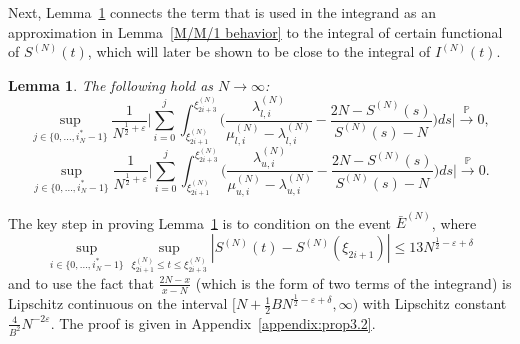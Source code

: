 \documentclass[11pt, reqno]{article}
\newtheorem{lemma}[theorem]{Lemma}
\numberwithin{equation}{section}
\numberwithin{theorem}{section}
\newcommand{\pto}{\ensuremath{\xrightarrow{\ \mathbb{P}\ }}}  %
\begin{document}
Next, Lemma~\ref{approx. rate} connects the term that is used in the integrand as an approximation in Lemma~\ref{M/M/1 behavior} to the integral of certain functional of $S^{(N)}(t)$, which will later be shown to be close to the integral of $I^{(N)}(t)$.
\begin{lemma}\label{approx. rate}
The following hold as $N\to\infty$:
\begin{equation}\label{eq:A7-1}
    \sup_{j\in\{0,...,i^*_N-1\}} \frac{1}{N^{\frac{1}{2}+\varepsilon}}\Big|\sum_{i=0}^j\int_{\xi^{(N)}_{2i+1}}^{\xi^{(N)}_{2i+3}} \Big(\frac{\lambda^{(N)}_{l,i}}{\mu^{(N)}_{l,i}-\lambda^{(N)}_{l,i}}-\frac{2N-S^{(N)}(s)}{S^{(N)}(s)-N}\Big)ds\Big|\pto 0,
\end{equation}
\begin{equation}\label{eq:A7-2}
    \sup_{j\in\{0,...,i^*_N-1\}} \frac{1}{N^{\frac{1}{2}+\varepsilon}}\Big|\sum_{i=0}^j\int_{\xi^{(N)}_{2i+1}}^{\xi^{(N)}_{2i+3}} \Big(\frac{\lambda^{(N)}_{u,i}}{\mu^{(N)}_{u,i}-\lambda^{(N)}_{u,i}}-\frac{2N-S^{(N)}(s)}{S^{(N)}(s)-N}\Big)ds\Big|\pto 0.
\end{equation}
\end{lemma}
The key step in proving Lemma~\ref{approx. rate} is to condition on the event $\bar{E}^{(N)}$, where $$\sup_{i\in\{0,...,i^*_N-1\}}\sup_{\xi^{(N)}_{2i+1}\leq t\leq \xi^{(N)}_{2i+3}}\left|S^{(N)}(t)-S^{(N)}(\xi_{2i+1})\right|\leq 13 N^{\frac{1}{2}-\varepsilon+\delta}$$ and to use the fact that 
$\frac{2N-x}{x-N}$ (which is the form of two terms of the integrand) is Lipschitz continuous on the interval $[N+\frac{1}{2}BN^{\frac{1}{2}-\varepsilon+\delta},\infty)$ with Lipschitz constant $\frac{4}{B^2}N^{-2\varepsilon}$. The proof is given in Appendix~\ref{appendix:prop3.2}.
\end{document}
